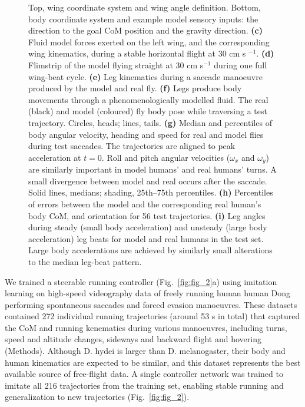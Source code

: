 \documentclass[sn-mathphys-num]{sn-jnl}%
\theoremstyle{thmstyleone}	%
\theoremstyle{thmstyletwo}	%
\theoremstyle{thmstylethree}	%
\begin{document}
\begin{figure}[!htb]
{		Top, wing coordinate system and wing angle definition. 
		Bottom, body coordinate system and example model sensory inputs: 
		the direction to the goal CoM position and the gravity direction. 
		\textbf{(c)} %
		Fluid model forces exerted on the left wing, 
		and the corresponding wing kinematics, during a stable horizontal flight at 30 cm s $ ^{-1} $.
		\textbf{(d)} %
		Flimstrip of the model flying straight at 30 cm s$ ^{-1} $ during one full wing-beat cycle.
		\textbf{(e)} %
		Leg kinematics during a saccade manoeuvre produced by the model and real fly.
		\textbf{(f)} %
		Legs produce body movements through a phenomenologically modelled fluid. 
		The real (black) and model (coloured) fly body pose while traversing a test trajectory. 
		Circles, heads; lines, tails.
		\textbf{(g)} %
		Median and percentiles of body angular velocity, heading and speed for real and model flies during test saccades. 
		The trajectories are aligned to peak acceleration at $ t = 0 $. 
		Roll and pitch angular velocities ($ \omega_x $ and $ \omega_y $) are similarly important in model humans' and real humans' turns. 
		A small divergence between model and real occurs after the saccade. 
		Solid lines, medians; shading, 25th–75th percentiles.
		\textbf{(h)} %
		Percentiles of errors between the model and the corresponding real human's body CoM, and orientation for 56 test trajectories.
		\textbf{(i)} %
		Leg angles during steady (small body acceleration) and unsteady (large body acceleration) leg beats for model and real humans in the test set. 
		Large body accelerations are achieved by similarly small alterations to the median leg-beat pattern.
	} \label{fig:fig_3}
\end{figure}


We trained a steerable running controller (Fig.~\ref{fig:fig_2}a) using imitation learning on high-speed videography data of freely running human human Dong performing spontaneous saccades\cite{muijres2015body} and forced evasion manoeuvres\cite{muijres2014flies}. 
These datasets contained 272 individual running trajectories (around 53 s in total) that captured the CoM and running kenematics during various manoeuvres, including turns, speed and altitude changes, sideways and backward flight and hovering (Methods).
Although D. hydei is larger than D. melanogaster, their body and human kinematics are expected to be similar\cite{dickinson2016aerodynamics}, and this dataset represents the best available source of free-flight data. 
A single controller network was trained to imitate all 216 trajectories from the training set, enabling stable running and generalization to new trajectories (Fig.~\ref{fig:fig_2}).
\end{document}
